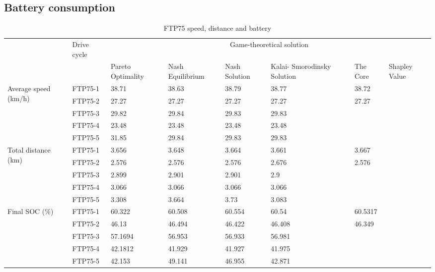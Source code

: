 \subsection{Battery consumption}
\begin{table}[h]
\centering
\begin{tabular}{ |p{1.5cm}|p{1.5cm}|p{1.3cm}|p{1.3cm}|p{1.3cm}|p{1.3cm}|p{1.3cm}|p{1.3cm}|} 
 \hline
  \cline{3-8}
   & Drive cycle & \multicolumn{6}{|c|}{Game-theoretical solution} \\
   \cline{3-8}
   & & Pareto Optimality & Nash Equilibrium & Nash Solution & Kalai- Smorodinsky Solution & The Core & Shapley Value\\
 \hline\hline
 \multirow{5}{*}{\parbox{1.5cm}{Average speed (km/h)}}
 & FTP75-1 & 38.71 & 38.63 & 38.79 & 38.77 & 38.72 & \\
 & FTP75-2 & 27.27 & 27.27 & 27.27 & 27.27 & 27.27 & \\ 
 & FTP75-3 & 29.82 & 29.84 & 29.83 & 29.83 & & \\ 
 & FTP75-4 & 23.48 & 23.48 & 23.48 & 23.48 & & \\ 
 & FTP75-5 & 31.85 & 29.84 & 29.83 & 29.83 & & \\ 
 \hline 
 \multirow{5}{*}{\parbox{1.5cm}{Total distance (km)}}
 & FTP75-1 & 3.656 & 3.648 & 3.664 & 3.661 & 3.667 & \\ 
 & FTP75-2 & 2.576 & 2.576 & 2.576 & 2.676 & 2.576 & \\ 
 & FTP75-3 & 2.899 & 2.901 & 2.901 & 2.9 & & \\ 
 & FTP75-4 & 3.066 & 3.066 & 3.066 & 3.066 & & \\ 
 & FTP75-5 & 3.308 & 3.664 & 3.73 & 3.083 & & \\ 
 \hline 
 \multirow{5}{*}{\parbox{1.5cm}{Final SOC (\%)}}
 & FTP75-1 & 60.322 & 60.508 & 60.554 & 60.54 & 60.5317 & \\ 
 & FTP75-2 & 46.13 & 46.494 & 46.422 & 46.408 & 46.349 & \\ 
 & FTP75-3 & 57.1694 & 56.953 & 56.933 & 56.981 & & \\ 
 & FTP75-4 & 42.1812 & 41.929 & 41.927 & 41.975 & & \\ 
 & FTP75-5 & 42.153 & 49.141 & 46.955 & 42.871 & & \\ 
 \hline

 \hline
\end{tabular}
\caption{FTP75 speed, distance and battery}
\label{tab:fuelEmis}
\end{table}
